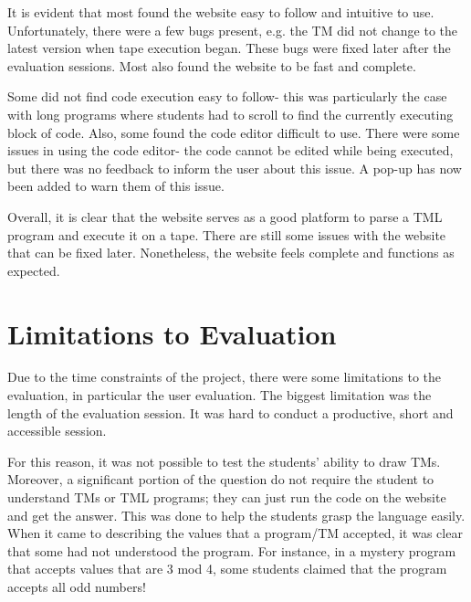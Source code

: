 It is evident that most found the website easy to follow and intuitive to use. Unfortunately, there were a few bugs present, e.g. the TM did not change to the latest version when tape execution began. These bugs were fixed later after the evaluation sessions. Most also found the website to be fast and complete. 

Some did not find code execution easy to follow- this was particularly the case with long programs where students had to scroll to find the currently executing block of code. Also, some found the code editor difficult to use. There were some issues in using the code editor- the code cannot be edited while being executed, but there was no feedback to inform the user about this issue. A pop-up has now been added to warn them of this issue.

Overall, it is clear that the website serves as a good platform to parse a TML program and execute it on a tape. There are still some issues with the website that can be fixed later. Nonetheless, the website feels complete and functions as expected.

\section{Limitations to Evaluation}
Due to the time constraints of the project, there were some limitations to the evaluation, in particular the user evaluation. The biggest limitation was the length of the evaluation session. It was hard to conduct a productive, short and accessible session. 

For this reason, it was not possible to test the students' ability to draw TMs. Moreover, a significant portion of the question do not require the student to understand TMs or TML programs; they can just run the code on the website and get the answer. This was done to help the students grasp the language easily. When it came to describing the values that a program/TM accepted, it was clear that some had not understood the program. For instance, in a mystery program that accepts values that are 3 mod 4, some students claimed that the program accepts all odd numbers!


